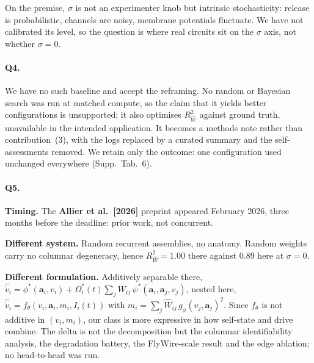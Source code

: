 \documentclass[11pt]{article}
\newcommand{\Rw}{R^2_{\widehat W}}
\newcommand{\Mat}[1]{\mathbf{#1}}
\begin{document}
On the premise, $\sigma$ is not an experimenter knob but intrinsic stochasticity:
release is probabilistic, channels are noisy, membrane potentials fluctuate. We
have not calibrated its level, so the question is where real circuits sit on the
$\sigma$ axis, not whether $\sigma = 0$.

\paragraph{Q4.}
We have no such baseline and accept the reframing. No random or Bayesian search
was run at matched compute, so the claim that it yields better configurations is
unsupported; it also optimises $\Rw$ against ground truth, unavailable in the
intended application. It becomes a methods note rather than contribution~(3),
with the logs replaced by a curated summary and the self-assessments removed. We
retain only the outcome: one configuration used unchanged everywhere
(Supp.~Tab.~6).

\paragraph{Q5.}
\textbf{Timing.} The \textbf{Allier et al.\ [2026]} preprint appeared February
2026, three months before the deadline: prior work, not concurrent.

\textbf{Different system.} Random recurrent assemblies, no anatomy. Random
weights carry no columnar degeneracy, hence $\Rw = 1.00$ there against $0.89$
here at $\sigma = 0$.

\textbf{Different formulation.} Additively separable there,
$\widehat{\dot v}_i = \phi^*(\Mat{a}_i, v_i)
 + \Omega^*_i(t)\sum_j W_{ij}\,\psi^*(\Mat{a}_i,\Mat{a}_j,v_j)$, nested here,
$\widehat{\dot v}_i = f_\theta(v_i, \Mat{a}_i, m_i, I_i(t))$ with
$m_i = \sum_j \widehat W_{ij}\, g_\phi(v_j,\Mat{a}_j)^2$. Since $f_\theta$ is not
additive in $(v_i, m_i)$, our class is more expressive in how self-state and
drive combine. The delta is not the decomposition but the columnar
identifiability analysis, the degradation battery, the FlyWire-scale result and
the edge ablation; no head-to-head was run.

\end{document}
